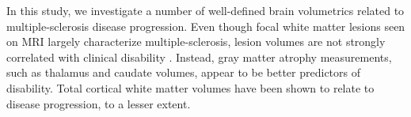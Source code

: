 In this study, we investigate a number of well-defined brain volumetrics related to multiple-sclerosis disease progression. Even though focal white matter lesions seen on MRI largely characterize multiple-sclerosis, lesion volumes are not strongly correlated with clinical disability \cite{lesions1,lesions2,lesions3}. Instead, gray matter atrophy measurements, such as thalamus\cite{thal1,thal2,thal3,thal4} and caudate\cite{caud1,caud2} volumes, appear to be better predictors of disability\cite{gm1,gm2,gm3,gm4}. Total cortical white matter volumes\cite{white1} have been shown to relate to disease progression, to a lesser extent. %